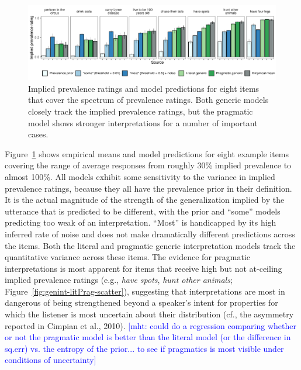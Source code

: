 \documentclass[floatsintext,doc]{apa6}
\begin{document}
\begin{figure}
\centering
\includegraphics{genint_files/figure-latex/genint-modelingResults-bars-1.pdf}
\caption{Implied prevalence ratings and model predictions for eight items that cover the spectrum of prevalence ratings. 
Both generic models closely track the implied prevalence ratings, but the pragmatic model shows stronger interpretations for a number of important cases.}
\label{fig:genint-modelingResults-bars}
\end{figure}


Figure~\ref{fig:genint-modelingResults-bars} shows empirical means and model predictions for eight example items covering the range of average responses from roughly 30\% implied prevalence to almost 100\%.
All models exhibit some sensitivity to the variance in implied prevalence ratings, because they all have the prevalence prior in their definition.
It is the actual magnitude of the strength of the generalization implied by the utterance that is predicted to be different, with the prior and \enquote{some} models predicting too weak of an interpretation.
\enquote{Most} is handicapped by its high inferred rate of noise and does not make dramatically different predictions across the items.
Both the literal and pragmatic generic interpretation models track the quantitative variance across these items.
The evidence for pragmatic interpretations is most apparent for items that receive high but not at-ceiling implied prevalence ratings (e.g., \emph{have spots}, \emph{hunt other animals}; Figure~\ref{fig:genint-litPrag-scatter}), suggesting that interpretations are most in dangerous of being strengthened beyond a speaker's intent for properties for which the listener is most uncertain about their distribution (cf., the asymmetry reported in Cimpian et al., 2010).
{\textcolor{Blue}{[mht: could do a regression comparing whether or not the pragmatic model is better than the literal model (or the difference in sq.err) vs. the entropy of the prior... to see if pragmatics is most visible under conditions of uncertainty]}}
\end{document}
